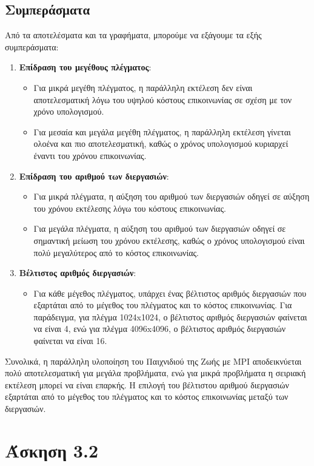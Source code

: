 \documentclass{article}
\begin{document}
\subsection*{Συμπεράσματα}
Από τα αποτελέσματα και τα γραφήματα, μπορούμε να εξάγουμε τα εξής συμπεράσματα:
\begin{enumerate}
    \item \textbf{Επίδραση του μεγέθους πλέγματος}:
    \begin{itemize}
        \item Για μικρά μεγέθη πλέγματος, η παράλληλη εκτέλεση δεν είναι αποτελεσματική λόγω του υψηλού κόστους επικοινωνίας σε σχέση με τον χρόνο υπολογισμού.
        \item Για μεσαία και μεγάλα μεγέθη πλέγματος, η παράλληλη εκτέλεση γίνεται ολοένα και πιο αποτελεσματική, καθώς ο χρόνος υπολογισμού κυριαρχεί έναντι του χρόνου επικοινωνίας.
    \end{itemize}
    \item \textbf{Επίδραση του αριθμού των διεργασιών}:
    \begin{itemize}
        \item Για μικρά πλέγματα, η αύξηση του αριθμού των διεργασιών οδηγεί σε αύξηση του χρόνου εκτέλεσης λόγω του κόστους επικοινωνίας.
        \item Για μεγάλα πλέγματα, η αύξηση του αριθμού των διεργασιών οδηγεί σε σημαντική μείωση του χρόνου εκτέλεσης, καθώς ο χρόνος υπολογισμού είναι πολύ μεγαλύτερος από το κόστος επικοινωνίας.
    \end{itemize}
    \item \textbf{Βέλτιστος αριθμός διεργασιών}:
    \begin{itemize}
        \item Για κάθε μέγεθος πλέγματος, υπάρχει ένας βέλτιστος αριθμός διεργασιών που εξαρτάται από το μέγεθος του πλέγματος και το κόστος επικοινωνίας. Για παράδειγμα, για πλέγμα 1024x1024, ο βέλτιστος αριθμός διεργασιών φαίνεται να είναι 4, ενώ για πλέγμα 4096x4096, ο βέλτιστος αριθμός διεργασιών φαίνεται να είναι 16.
    \end{itemize}
\end{enumerate}
Συνολικά, η παράλληλη υλοποίηση του Παιχνιδιού της Ζωής με MPI αποδεικνύεται πολύ αποτελεσματική για μεγάλα προβλήματα, ενώ για μικρά προβλήματα η σειριακή εκτέλεση μπορεί να είναι επαρκής. Η επιλογή του βέλτιστου αριθμού διεργασιών εξαρτάται από το μέγεθος του πλέγματος και το κόστος επικοινωνίας μεταξύ των διεργασιών.
\section*{Άσκηση 3.2}
\end{document}
